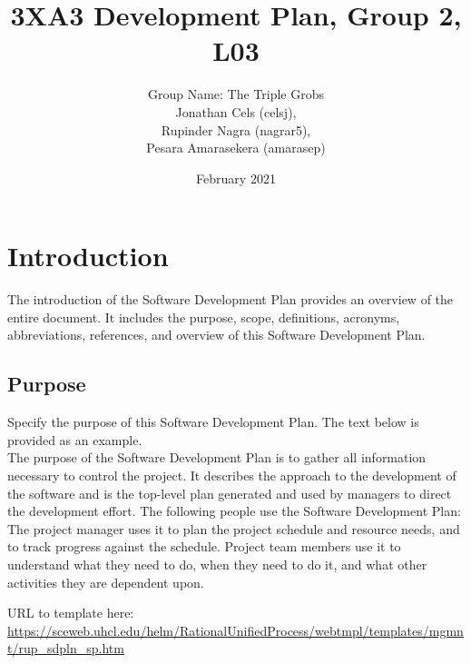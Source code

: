 \documentclass{article}
\title{3XA3 Development Plan, Group 2, L03}
\author{Group Name: The Triple Grobs \\ Jonathan Cels (celsj), \\Rupinder Nagra (nagrar5), \\Pesara Amarasekera (amarasep)}
\date{February 2021}
\begin{document}
\maketitle

\section{Introduction}
The introduction of the Software Development Plan provides an overview of the entire document. It includes the purpose, scope, definitions, acronyms, abbreviations, references, and overview of this Software Development Plan.

\subsection{Purpose}
Specify the purpose of this Software Development Plan. The text below is provided as an example. \\
The purpose of the Software Development Plan is to gather all information necessary to control the project. It describes the approach to the development of the software and is the top-level plan generated and used by managers to direct the development effort. The following people use the Software Development Plan:
The project manager uses it to plan the project schedule and resource needs, and to track progress against the schedule. Project team members use it to understand what they need to do, when they need to do it, and what other activities they are dependent upon.

\bigskip
URL to template here: \url{https://sceweb.uhcl.edu/helm/RationalUnifiedProcess/webtmpl/templates/mgmnt/rup_sdpln_sp.htm}
\end{document}
